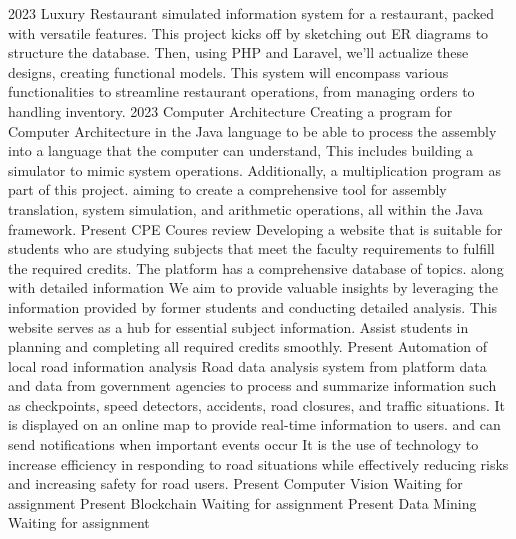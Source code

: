 \documentclass[9pt]{developercv} %
\begin{document}
\begin{entrylist}
            \entry
		{2023}
		{Luxury Restaurant}
		{}
		{%
         simulated information system for a restaurant, packed with versatile features. This project kicks off by sketching out ER diagrams to structure the database. Then, using PHP and Laravel, we'll actualize these designs, creating functional models. This system will encompass various functionalities to streamline restaurant operations, from managing orders to handling inventory.}
            \entry
		{2023}
		{Computer Architecture}
		{}
		{%
        Creating a program for Computer Architecture in the Java language to be able to process the assembly into a language that the computer can understand, This includes building a simulator to mimic system operations. Additionally,  a multiplication program as part of this project. aiming to create a comprehensive tool for assembly translation, system simulation, and arithmetic operations, all within the Java framework.}
            \entry
		{Present}
		{CPE Coures review}
		{}
		{%
        Developing a website that is suitable for students who are studying subjects that meet the faculty requirements to fulfill the required credits. The platform has a comprehensive database of topics. along with detailed information We aim to provide valuable insights by leveraging the information provided by former students and conducting detailed analysis. This website serves as a hub for essential subject information. Assist students in planning and completing all required credits smoothly.}
            \entry
		{Present}
		{Automation of local road information analysis}
		{}
		{%
        Road data analysis system from platform data and data from government agencies to process and summarize information such as checkpoints, speed detectors, accidents, road closures, and traffic situations. It is displayed on an online map to provide real-time information to users. and can send notifications when important events occur It is the use of technology to increase efficiency in responding to road situations while effectively reducing risks and increasing safety for road users.}
            \entry
		{Present}
		{Computer Vision}
		{}
		{%
        Waiting for assignment}
            \entry
		{Present}
		{Blockchain}
		{}
		{%
        Waiting for assignment}
        \entry
		{Present}
		{Data Mining}
		{}
		{%
        Waiting for assignment}
            
\end{entrylist}
\end{document}
